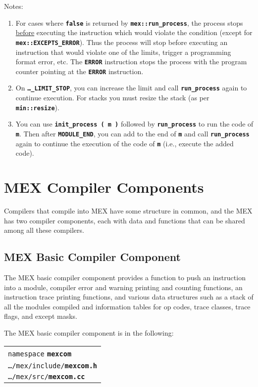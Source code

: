 \documentclass[12pt]{article}
\makeatletter
\newcommand{\TT}[1]{{\tt \bfseries #1}}
\newcommand{\ttkey}[1]{\TT{#1}\index{#1@{\tt #1}}}
\newcommand{\EOL}{\penalty \exhyphenpenalty}
\newenvironment{indpar}[1][0.3in]%
	{\begin{list}{}%
		     {\setlength{\itemsep}{0in}%
		      \setlength{\topsep}{0in}%
		      \setlength{\parsep}{1ex}%
		      \setlength{\labelwidth}{#1}%
		      \setlength{\leftmargin}{#1}%
		      \addtolength{\leftmargin}{\labelsep}}%
	 \item}%
	{\end{list}}
\makeatother
\begin{document}
Notes:
\begin{enumerate}
\item For cases where \TT{false} is returned by \TT{mex::run\_process},
the process stops \underline{before} executing the instruction which
would violate the condition (except for \TT{mex::\EOL EXCEPTS\_\EOL ERROR}).
Thus the process will stop before executing an instruction that would
violate one of the limits, trigger a programming format error, etc.
The \TT{ERROR} instruction stops the process with the program counter
pointing at the \TT{ERROR} instruction.
\item \label{LIMIT-STOP-NOTE}
On \TT{\ldots\_LIMIT\_STOP}, you can increase the limit
and call \TT{run\_process} again to continue execution.
For stacks you must resize the stack (as per \TT{min::\EOL resize}).
\item You can use \TT{init\_process ( m )} followed by \TT{run\_process}
to run the code of \TT{m}.  Then after \TT{MODULE\_END},
you can add to the end of \TT{m}
and call \TT{run\_process} again to continue the execution of the code
of \TT{m} (i.e., execute the added code).
\end{enumerate}

\section{MEX Compiler Components}
\label{MEX-COMPILER-COMPONENTS}

Compilers that compile into MEX have some structure in common,
and the MEX has two compiler components, each with data and
functions that can be shared among all these compilers.

\subsection{MEX Basic Compiler Component}
\label{MEX-BASIC-COMPILER-COMPONENT}

The MEX basic compiler component provides a function to push an
instruction into a module, compiler error and
warning printing and counting functions, an instruction trace printing
functions, and various data structures such as a stack of all the
modules compiled and information tables for op codes, trace classes,
trace flags, and except masks.

The MEX basic compiler component is in the following:

\begin{indpar}
\begin{tabular}{l}
{\tt namespace} \ttkey{mexcom}
\\
{\tt \ldots/mex/include/}\ttkey{mexcom.h}
\\
{\tt \ldots/mex/src/}\ttkey{mexcom.cc}
\end{tabular}
\end{indpar}
\end{document}

